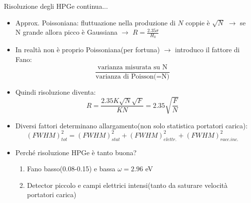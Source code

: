 \documentclass{beamer}
\begin{document}
\begin{frame}{Risoluzione degli HPGe continua...}
\begin{itemize}
    \item Approx. Poissoniana: fluttuazione nella produzione di $N$ coppie è $\sqrt{N}$ $\to$ se N grande allora picco è Gaussiana $\to$  $R=\frac{2.35 \sigma}{H_0}$
    \item In realtà non è proprio Poissoniana(per fortuna) $\to$ introduco il fattore di Fano: \begin{equation}
        \frac{\textrm{varianza misurata su N}}{\textrm{varianza di Poisson(=N)}}
    \end{equation}
    \item Quindi risoluzione diventa:\begin{equation}
        R = \frac{2.35 K \sqrt{N} \sqrt{F}}{K N} = 2.35 \sqrt{\frac{F}{N}}
    \end{equation}
    
    \item Diversi fattori determinano allargamento(non solo statistica portatori carica): \begin{equation}
        (FWHM)^2_{tot} = (FWHM)^2_{stat} + (FWHM)^2_{elettr.} + (FWHM)^2_{racc.inc.} 
    \end{equation}
    \item Perché risoluzione HPGe è tanto buona?\begin{enumerate}
        \item Fano basso(0.08-0.15) e bassa $\omega = 2.96$ eV
        \item Detector piccolo e campi elettrici intensi(tanto da saturare velocità portatori carica)
    \end{enumerate}
\end{itemize}
    
    
        
\end{frame}
\end{document}
